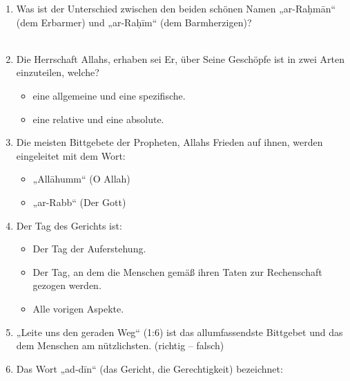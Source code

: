 \begin{enumerate}[leftmargin=1.6em]
  \begin{itemize}
    \item Er ist der aus Liebe und Ehrfurcht angebetete Gott.
    \item Niemandem wurde dieser Name gegeben außer Allah.
    \item Das Bezugswort für alle (99 schönen) Namen Gottes.
    \item Man sagt, dass dieser der großartigste aller Namen Gottes ist.
    \item Der bestimmte Artikel „Al“ wird im Appellativ nicht ausgelassen.
    \item Dafür gelten all die vorigen Aspekte.
  \end{itemize}
\item Was ist der Unterschied zwischen den beiden schönen Namen „ar-Raḥmān“ (dem Erbarmer)
  und „ar-Raḥīm“ (dem Barmherzigen)?\\
  \hrulefill\\
  \hrulefill
\item Die Herrschaft Allahs, erhaben sei Er, über Seine Geschöpfe ist in zwei Arten einzuteilen,
  welche?
  \begin{itemize}
    \item eine allgemeine und eine spezifische.
    \item eine relative und eine absolute.
  \end{itemize}
\item Die meisten Bittgebete der Propheten, Allahs Frieden auf ihnen, werden eingeleitet mit dem
  Wort:
  \begin{itemize}
    \item „Allāhumm“ (O Allah)
    \item „ar-Rabb“ (Der Gott)
  \end{itemize}
\item Der Tag des Gerichts ist:
  \begin{itemize}
    \item Der Tag der Auferstehung.
    \item Der Tag, an dem die Menschen gemäß ihren Taten zur Rechenschaft gezogen werden.
    \item Alle vorigen Aspekte.
  \end{itemize}
\item „Leite uns den geraden Weg“ (1:6) ist das allumfassendste Bittgebet und das dem Menschen
  am nützlichsten. (richtig -- falsch)
\item Das Wort „ad-dīn“ (das Gericht, die Gerechtigkeit) bezeichnet:
  \begin{itemize}

\end{itemize}
\end{enumerate}
